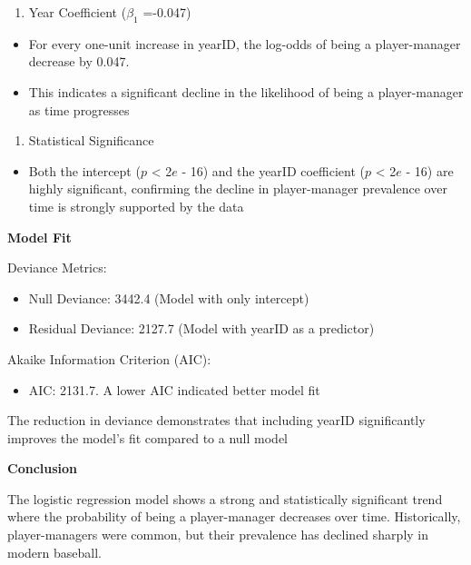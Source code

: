 \documentclass[
]{article}
\providecommand{\tightlist}{%
  \setlength{\itemsep}{0pt}\setlength{\parskip}{0pt}}
\begin{document}
\begin{enumerate}
\def\labelenumi{\arabic{enumi}.}
\setcounter{enumi}{1}
\tightlist
\item
  Year Coefficient (\(\beta_{1}\) =-0.047)
\end{enumerate}

\begin{itemize}
\item
  For every one-unit increase in yearID, the log-odds of being a
  player-manager decrease by 0.047.
\item
  This indicates a significant decline in the likelihood of being a
  player-manager as time progresses
\end{itemize}

\begin{enumerate}
\def\labelenumi{\arabic{enumi}.}
\setcounter{enumi}{2}
\tightlist
\item
  Statistical Significance
\end{enumerate}

\begin{itemize}
\tightlist
\item
  Both the intercept (\(p\) \textless{} 2\(e\) - 16) and the yearID
  coefficient (\(p\) \textless{} 2\(e\) - 16) are highly significant,
  confirming the decline in player-manager prevalence over time is
  strongly supported by the data
\end{itemize}

\textbf{Model Fit}

Deviance Metrics:

\begin{itemize}
\item
  Null Deviance: 3442.4 (Model with only intercept)
\item
  Residual Deviance: 2127.7 (Model with yearID as a predictor)
\end{itemize}

Akaike Information Criterion (AIC):

\begin{itemize}
\tightlist
\item
  AIC: 2131.7. A lower AIC indicated better model fit
\end{itemize}

The reduction in deviance demonstrates that including yearID
significantly improves the model's fit compared to a null model

\textbf{Conclusion}

The logistic regression model shows a strong and statistically
significant trend where the probability of being a player-manager
decreases over time. Historically, player-managers were common, but
their prevalence has declined sharply in modern baseball.
\end{document}
